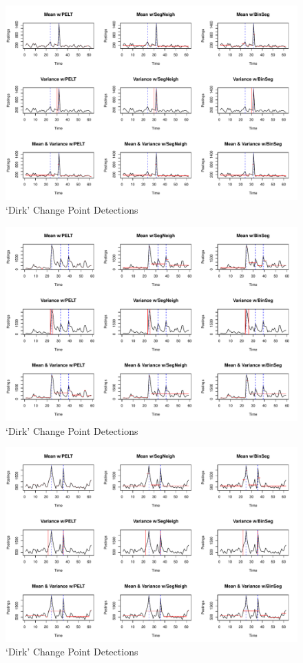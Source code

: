 \documentclass[../main.tex]{subfiles}
\begin{document}
\begin{figure}[h]
    \includegraphics[width=\textwidth]{figures/connexxionresults}
    \caption{`Dirk' Change Point Detections}
    \label{fig:connexxion}
\end{figure}

\begin{figure}[h]
    \includegraphics[width=\textwidth]{figures/dapresults}
    \caption{`Dirk' Change Point Detections}
    \label{fig:dap}
\end{figure}

\begin{figure}[h]
    \includegraphics[width=\textwidth]{figures/jumboresults}
    \caption{`Dirk' Change Point Detections}
    \label{fig:jumbo}
\end{figure}
\end{document}
